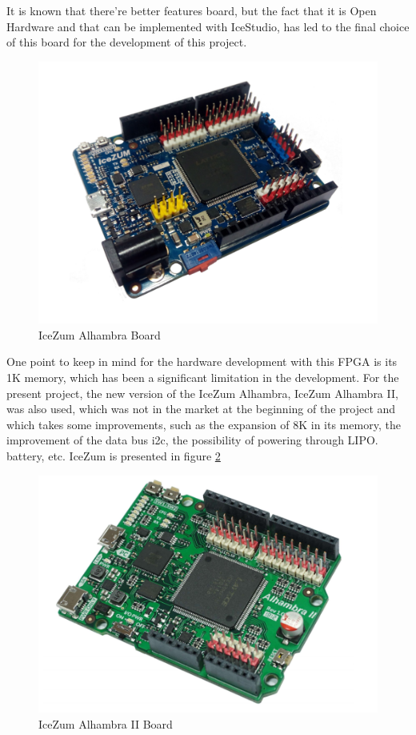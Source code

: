 It is known that there’re better features board, but the fact that it is Open Hardware and that can be implemented with IceStudio, has led to the final choice of this board for the development of this project.\newline
\begin{center}
\begin{figure}[H]
	\center
	\includegraphics[scale=0.4]{imagenes/EstadoArte/IceZumAlhambra.pdf}
	\caption{IceZum Alhambra Board}
	\label{fig:IceZumAlhambraI}
\end{figure} 
\end{center}
One point to keep in mind for the hardware development with this FPGA is its 1K memory, which has been a significant limitation in the development. For the present project, the new version of the IceZum Alhambra, IceZum Alhambra II, was also used, which was not in the market at the beginning of the project and which takes some improvements, such as the expansion of 8K in its memory, the improvement of the data bus i2c, the possibility of powering through LIPO. battery, etc. IceZum is presented in figure \ref{fig: IceZumAlhambraII}
\begin{center}
	\begin{figure}[H]
		\center
		\includegraphics[scale=0.5]{imagenes/EstadoArte/IceZumAlhambra.PNG}
		\caption{IceZum Alhambra II Board}
		\label{fig: IceZumAlhambraII}
	\end{figure} 
\end{center}


